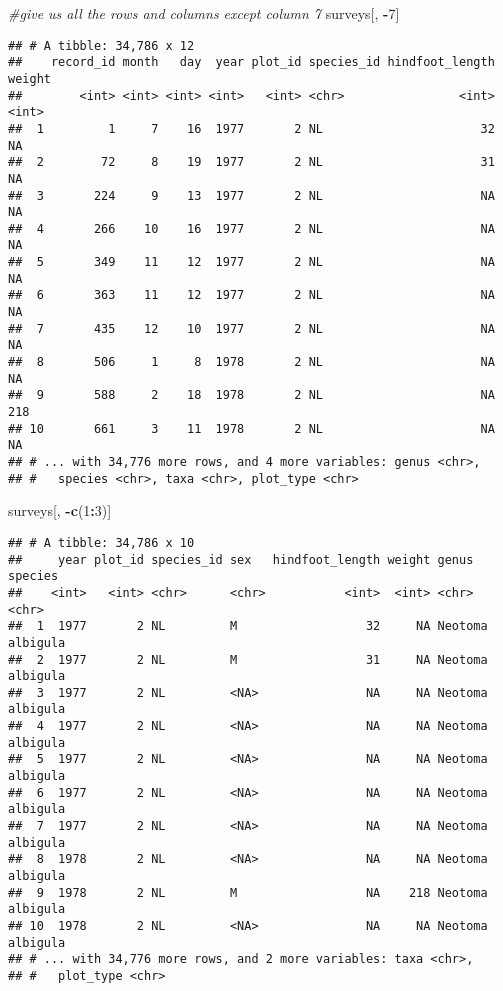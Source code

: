 \documentclass[]{article}
\newenvironment{Shaded}{\begin{snugshade}}{\end{snugshade}}
\newcommand{\KeywordTok}[1]{\textcolor[rgb]{0.13,0.29,0.53}{\textbf{#1}}}
\newcommand{\DecValTok}[1]{\textcolor[rgb]{0.00,0.00,0.81}{#1}}
\newcommand{\CommentTok}[1]{\textcolor[rgb]{0.56,0.35,0.01}{\textit{#1}}}
\newcommand{\OperatorTok}[1]{\textcolor[rgb]{0.81,0.36,0.00}{\textbf{#1}}}
\newcommand{\NormalTok}[1]{#1}
\begin{document}
\begin{Shaded}
\begin{Highlighting}[]
\CommentTok{#give us all the rows and columns except column 7}
\NormalTok{surveys[, }\OperatorTok{-}\DecValTok{7}\NormalTok{]}
\end{Highlighting}
\end{Shaded}

\begin{verbatim}
## # A tibble: 34,786 x 12
##    record_id month   day  year plot_id species_id hindfoot_length weight
##        <int> <int> <int> <int>   <int> <chr>                <int>  <int>
##  1         1     7    16  1977       2 NL                      32     NA
##  2        72     8    19  1977       2 NL                      31     NA
##  3       224     9    13  1977       2 NL                      NA     NA
##  4       266    10    16  1977       2 NL                      NA     NA
##  5       349    11    12  1977       2 NL                      NA     NA
##  6       363    11    12  1977       2 NL                      NA     NA
##  7       435    12    10  1977       2 NL                      NA     NA
##  8       506     1     8  1978       2 NL                      NA     NA
##  9       588     2    18  1978       2 NL                      NA    218
## 10       661     3    11  1978       2 NL                      NA     NA
## # ... with 34,776 more rows, and 4 more variables: genus <chr>,
## #   species <chr>, taxa <chr>, plot_type <chr>
\end{verbatim}

\begin{Shaded}
\begin{Highlighting}[]
\NormalTok{surveys[, }\OperatorTok{-}\KeywordTok{c}\NormalTok{(}\DecValTok{1}\OperatorTok{:}\DecValTok{3}\NormalTok{)]}
\end{Highlighting}
\end{Shaded}

\begin{verbatim}
## # A tibble: 34,786 x 10
##     year plot_id species_id sex   hindfoot_length weight genus   species 
##    <int>   <int> <chr>      <chr>           <int>  <int> <chr>   <chr>   
##  1  1977       2 NL         M                  32     NA Neotoma albigula
##  2  1977       2 NL         M                  31     NA Neotoma albigula
##  3  1977       2 NL         <NA>               NA     NA Neotoma albigula
##  4  1977       2 NL         <NA>               NA     NA Neotoma albigula
##  5  1977       2 NL         <NA>               NA     NA Neotoma albigula
##  6  1977       2 NL         <NA>               NA     NA Neotoma albigula
##  7  1977       2 NL         <NA>               NA     NA Neotoma albigula
##  8  1978       2 NL         <NA>               NA     NA Neotoma albigula
##  9  1978       2 NL         M                  NA    218 Neotoma albigula
## 10  1978       2 NL         <NA>               NA     NA Neotoma albigula
## # ... with 34,776 more rows, and 2 more variables: taxa <chr>,
## #   plot_type <chr>
\end{verbatim}
\end{document}
